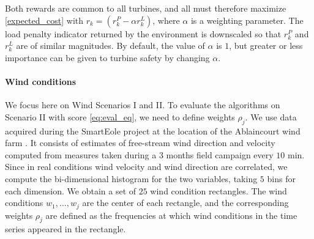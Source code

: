 \documentclass{article}
\begin{document}
Both rewards are common to all turbines, and all must therefore maximize \eqref{expected_cost} with $r_k = (r^P_k - \alpha r^L_k)$, where $\alpha$ is a weighting parameter. The load penalty indicator returned by the environment is downscaled so that $r^P_k$ and $r^L_k$ are of similar magnitudes. By default, the value of $\alpha$ is $1$, but greater or less importance can be given to turbine safety by changing $\alpha$. 

\paragraph{Wind conditions}
We focus here on Wind Scenarios I and II. To evaluate the algorithms on Scenario II with score \eqref{eq:eval_eq}, we need to define weights $\rho_j$. We use data acquired during the SmartEole project at the location of the Ablaincourt wind farm \cite{7turb-layout}. It consists of estimates of free-stream wind direction and velocity computed from measures taken during a $3$ months field campaign every $10$ min. Since in real conditions wind velocity and wind direction are correlated, we compute the bi-dimensional histogram for the two variables, taking $5$ bins for each dimension. We obtain a set of $25$ wind condition rectangles. The wind conditions $w_1, \dots, w_j$ are the center of each rectangle, and the corresponding weights $\rho_j$ are defined as the frequencies at which wind conditions in the time series appeared in the rectangle.
%
\end{document}
